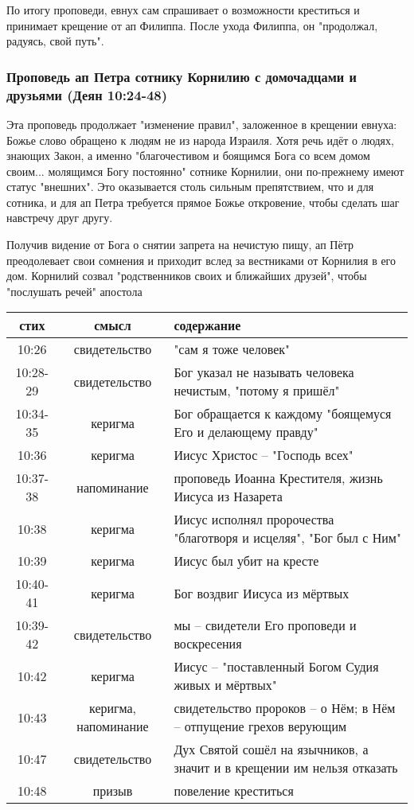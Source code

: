 По итогу проповеди, евнух сам спрашивает о возможности креститься и принимает крещение от ап Филиппа.
После ухода Филиппа, он "продолжал, радуясь, свой путь".

\subsubsection*{Проповедь ап Петра сотнику Корнилию с домочадцами и друзьями (Деян 10:24-48)}
Эта проповедь продолжает "изменение правил", заложенное в крещении евнуха: Божье слово обращено к людям не из народа Израиля.
Хотя речь идёт о людях, знающих Закон, а именно "благочестивом и боящимся Бога со всем домом своим... молящимся Богу постоянно" сотнике Корнилии, они по-прежнему имеют статус "внешних".
Это оказывается столь сильным препятствием, что и для сотника, и для ап Петра требуется прямое Божье откровение, чтобы сделать шаг навстречу друг другу.

Получив видение от Бога о снятии запрета на нечистую пищу, ап Пётр преодолевает свои сомнения и приходит вслед за вестниками от Корнилия в его дом.
Корнилий созвал "родственников своих и ближайших друзей", чтобы "послушать речей" апостола

\begin{center}
	\begin{longtable}{ |c|c|p{}| } 
		\hline
		стих & смысл & содержание \\
		\hline\hline
		10:26 & свидетельство & "сам я тоже человек" \\
		10:28-29 & свидетельство & Бог указал не называть человека нечистым, "потому я пришёл" \\
		10:34-35 & керигма & Бог обращается к каждому "боящемуся Его и делающему правду" \\
		10:36 & керигма & Иисус Христос – "Господь всех" \\
		10:37-38 & напоминание & проповедь Иоанна Крестителя, жизнь Иисуса из Назарета \\
		10:38 & керигма & Иисус исполнял пророчества "благотворя и исцеляя", "Бог был с Ним" \\
		10:39 & керигма & Иисус был убит на кресте \\
		10:40-41 & керигма & Бог воздвиг Иисуса из мёртвых \\
		10:39-42 & свидетельство & мы – свидетели Его проповеди и воскресения \\
		10:42 & керигма & Иисус – "поставленный Богом Судия живых и мёртвых" \\
		10:43 & керигма, напоминание & свидетельство пророков – о Нём; в Нём – отпущение грехов верующим \\
		10:47 & свидетельство & Дух Святой сошёл на язычников, а значит и в крещении им нельзя отказать \\
		10:48 & призыв & повеление креститься \\
		\hline
	\end{longtable}
\end{center}

